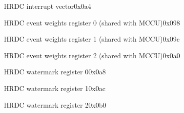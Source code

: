 \begin{register}{H}{RDC interrupt vector}{0x0a4}
	\label{RDC_intrv}
	\regnewline
\end{register}
\begin{register}{H}{RDC event weights register 0 (shared with MCCU)}{0x098}
	\label{RDC_weight0}
	\regnewline
\end{register}
\begin{register}{H}{RDC event weights register 1 (shared with MCCU)}{0x09c}
	\label{RDC_weight1}
	\regnewline
\end{register}
\begin{register}{H}{RDC event weights register 2 (shared with MCCU)}{0x0a0}
	\label{MCCU_weight1}
	\regnewline
\end{register}


\begin{register}{H}{RDC watermark register 0}{0x0a8}
	\label{RDC_water0}
	\regnewline
\end{register}


\begin{register}{H}{RDC watermark register 1}{0x0ac}
	\label{RDC_water1}
	\regnewline
\end{register}

\begin{register}{H}{RDC watermark register 2}{0x0b0}
	\label{RDC_water2}
	\regnewline
\end{register}


